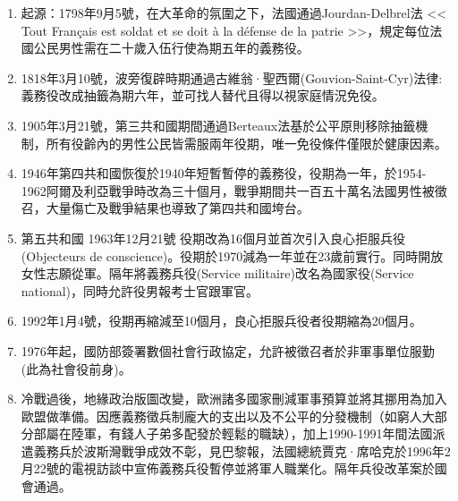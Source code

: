 \documentclass[a4paper,14pt]{extarticle}
\theoremstyle{plain}
\theoremstyle{remark}
\numberwithin{equation}{section}
\begin{document}
\begin{enumerate}
	\item 起源：1798年9月5號，在大革命的氛圍之下，法國通過Jourdan-Delbrel法 << Tout Français est soldat et se doit à la défense de la patrie >>，規定每位法國公民男性需在二十歲入伍行使為期五年的義務役\cite{wiki_service_militaire}。
	\item 1818年3月10號，波旁復辟時期通過古維翁·聖西爾(Gouvion-Saint-Cyr)法律: 義務役改成抽籤為期六年，並可找人替代且得以視家庭情況免役。
\item 1905年3月21號，第三共和國期間通過Berteaux法\cite{loi_berteaux_1905}基於公平原則移除抽籤機制，所有役齡內的男性公民皆需服兩年役期，唯一免役條件僅限於健康因素。
\item 1946年第四共和國恢復於1940年短暫暫停的義務役，役期為一年，於1954-1962阿爾及利亞戰爭時改為三十個月，戰爭期間共一百五十萬名法國男性被徵召，大量傷亡及戰爭結果也導致了第四共和國垮台。
\item 第五共和國 1963年12月21號 役期改為16個月並首次引入良心拒服兵役(Objecteurs de conscience)。役期於1970減為一年並在23歲前實行。同時開放女性志願從軍。隔年將義務兵役(Service militaire)改名為國家役(Service national)，同時允許役男報考士官跟軍官。
\item 1992年1月4號，役期再縮減至10個月，良心拒服兵役者役期縮為20個月。
\item 1976年起，國防部簽署數個社會行政協定，允許被徵召者於非軍事單位服勤(此為社會役前身)。 
\item 冷戰過後，地緣政治版圖改變，歐洲諸多國家刪減軍事預算並將其挪用為加入歐盟做準備。因應義務徵兵制龐大的支出以及不公平的分發機制（如窮人大部分部屬在陸軍，有錢人子弟多配發於輕鬆的職缺），加上1990-1991年間法國派遣義務兵於波斯灣戰爭成效不彰，見巴黎報\cite{service_militaire_parisien_2018}，法國總統賈克·席哈克於1996年2月22號的電視訪談中宣佈義務兵役暫停並將軍人職業化。隔年兵役改革案於國會通過。

\end{enumerate}
\end{document}
